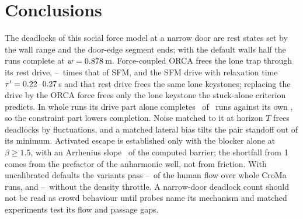 \section{Conclusions}\label{sec:conclusions}
The deadlocks of this social force model at a narrow door are rest states set by the wall range and the door-edge segment ends; with the default walls half the runs complete at $w=0.878$\,m. Force-coupled ORCA frees the lone trap through its rest drive, \RevAoneDriveRatioLo--\RevAoneDriveRatioHi\ times that of SFM, and the SFM drive with relaxation time $\tau'=0.22$--$0.27$\,s and that rest drive frees the same lone keystones; replacing the drive by the ORCA force frees only the lone keystone the stuck-alone criterion predicts. In whole runs its drive part alone completes \RwOneDriveK\ of \RwOneN\ runs against its own \RwOneOrcaK, so the constraint part lowers completion. Noise matched to it at horizon $T$ frees deadlocks by fluctuations, and a matched lateral bias tilts the pair standoff out of its minimum. Activated escape is established only with the blocker alone at $\beta\ge1.5$, with an Arrhenius slope \RzTtwoRatio\ of the computed barrier; the shortfall from 1 comes from the prefactor of the anharmonic well, not from friction. With uncalibrated defaults the variants pass \RevDThreeRatioMin--\RevDThreeRatioMax\ of the human flow over whole CroMa runs, and \RvBoneCroOffMin--\RvBoneCroOffMax\ without the density throttle. A narrow-door deadlock count should not be read as crowd behaviour until probes name its mechanism and matched experiments test its flow and passage gaps.
